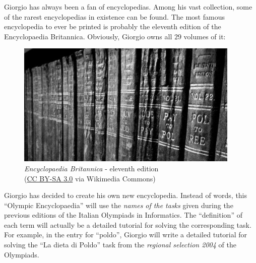 \usepackage{xcolor}
\usepackage{afterpage}
\usepackage{caption}
\usepackage{hyperref}
\usepackage{pifont,mdframed}
\usepackage[bottom]{footmisc}

\makeatletter
\gdef\this@inputfilename{input.txt}
\gdef\this@outputfilename{output.txt}
\makeatother

\newcommand{\inputfile}{\texttt{input.txt}}
\newcommand{\outputfile}{\texttt{output.txt}}

\newenvironment{warning}
  {\par\begin{mdframed}[linewidth=2pt,linecolor=gray]%
    \begin{list}{}{\leftmargin=1cm
                   \labelwidth=\leftmargin}\item[\Large\ding{43}]}
  {\end{list}\end{mdframed}\par}

Giorgio has always been a fan of encyclopedias. Among his vast collection, some of the rarest encyclopedias in existence can be found. The most famous encyclopedia to ever be printed is probably the eleventh edition of the Encyclopaedia Britannica. Obviously, Giorgio owns all $29$ volumes of it:

\begin{figure}[h]
  \centering
  \includegraphics[width=0.95\textwidth]{britannica.jpg}
  \caption*{\emph{Encyclopaedia Britannica} - eleventh edition \\ \scriptsize (\href{http://creativecommons.org/licenses/by-sa/3.0}{CC BY-SA 3.0} via Wikimedia Commons)}
\end{figure}

Giorgio has decided to create his own new encyclopedia. Instead of words, this ``Olympic Encyclopaedia'' will use the \emph{names of the tasks} given during the previous editions of the Italian Olympiads in Informatics. The ``definition'' of each term will actually be a detailed tutorial for solving the corresponding task. For example, in the entry for ``poldo'', Giorgio will write a detailed tutorial for solving the ``La dieta di Poldo'' task from the \emph{regional selection 2004} of the Olympiads.

